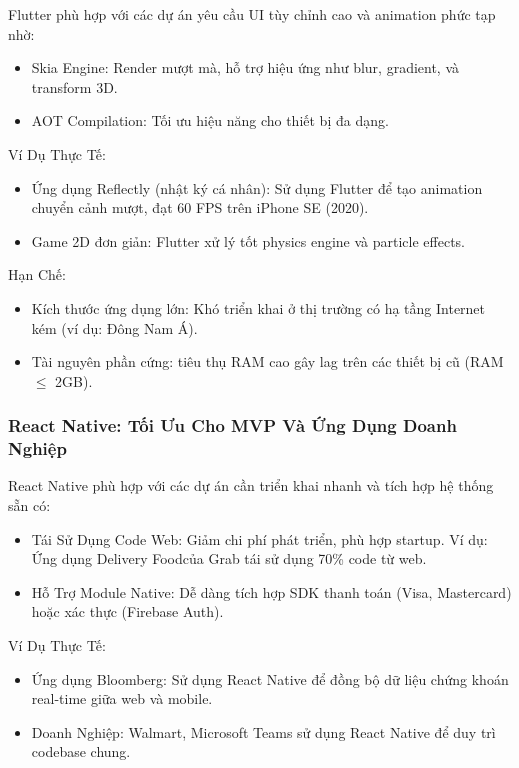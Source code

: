  Flutter phù hợp với các dự án yêu cầu UI tùy chỉnh cao và animation phức tạp nhờ:
  \setlength{\leftmargini}{1.5cm}
  \begin{itemize}
    \item Skia Engine: Render mượt mà, hỗ trợ hiệu ứng như blur, gradient, và transform 3D.
    \item AOT Compilation: Tối ưu hiệu năng cho thiết bị đa dạng.
  \end{itemize}


  Ví Dụ Thực Tế:
  \setlength{\leftmargini}{1.5cm}
  \begin{itemize}
      \item Ứng dụng Reflectly (nhật ký cá nhân): Sử dụng Flutter để tạo animation chuyển cảnh mượt, đạt 60 FPS trên iPhone SE (2020).
      \item Game 2D đơn giản: Flutter xử lý tốt physics engine và particle effects.
  \end{itemize}

  Hạn Chế:
  \setlength{\leftmargini}{1.5cm}
  \begin{itemize}
      \item Kích thước ứng dụng lớn: Khó triển khai ở thị trường có hạ tầng Internet kém (ví dụ: Đông Nam Á).
      \item Tài nguyên phần cứng: tiêu thụ RAM cao gây lag trên các thiết bị cũ (RAM $\leq$ 2GB).
  \end{itemize}

\subsubsection{React Native: Tối Ưu Cho MVP Và Ứng Dụng Doanh Nghiệp}
    
      React Native phù hợp với các dự án cần triển khai nhanh và tích hợp hệ thống sẵn có:
      \setlength{\leftmargini}{1.5cm}
      \begin{itemize}
        \item Tái Sử Dụng Code Web: Giảm chi phí phát triển, phù hợp startup. Ví dụ: Ứng dụng Delivery Foodcủa Grab tái sử dụng 70\% code từ web.
        \item Hỗ Trợ Module Native: Dễ dàng tích hợp SDK thanh toán (Visa, Mastercard) hoặc xác thực (Firebase Auth).
      \end{itemize}

    
      Ví Dụ Thực Tế:
      \setlength{\leftmargini}{1.5cm}
      \begin{itemize}
          \item Ứng dụng Bloomberg: Sử dụng React Native để đồng bộ dữ liệu chứng khoán real-time giữa web và mobile.
          \item Doanh Nghiệp: Walmart, Microsoft Teams sử dụng React Native để duy trì codebase chung.
      \end{itemize}
    

